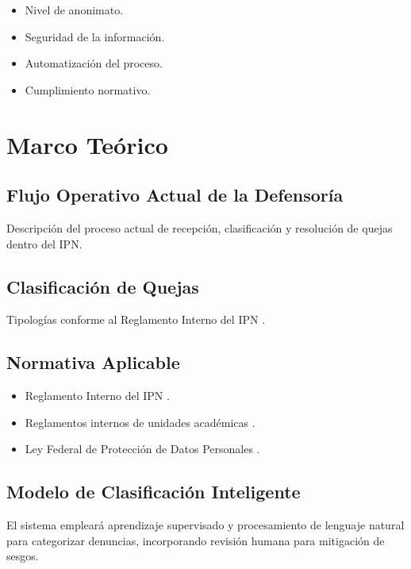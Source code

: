 \documentclass[12pt,oneside]{report}
\begin{document}
\begin{itemize}
    \item Nivel de anonimato.
    \item Seguridad de la información.
    \item Automatización del proceso.
    \item Cumplimiento normativo.
\end{itemize}

\chapter{Marco Teórico}

\section{Flujo Operativo Actual de la Defensoría}

Descripción del proceso actual de recepción, clasificación y resolución de quejas dentro del IPN.

\section{Clasificación de Quejas}

Tipologías conforme al Reglamento Interno del IPN \cite{ref9}.

\section{Normativa Aplicable}

\begin{itemize}
    \item Reglamento Interno del IPN \cite{ref9}.
    \item Reglamentos internos de unidades académicas \cite{ref10}.
    \item Ley Federal de Protección de Datos Personales \cite{ref11}.
\end{itemize}

\section{Modelo de Clasificación Inteligente}

El sistema empleará aprendizaje supervisado y procesamiento de lenguaje natural para categorizar denuncias, incorporando revisión humana para mitigación de sesgos.

\end{document}
